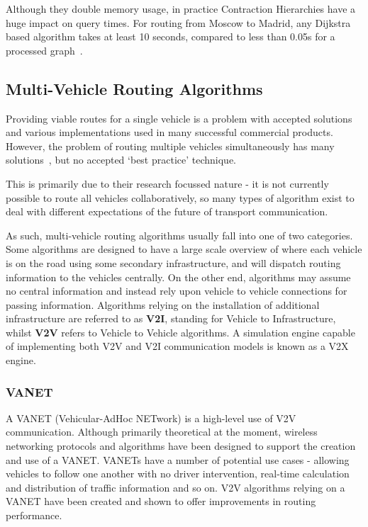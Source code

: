 \documentclass[ %
                    author={Alexander Hill},
                supervisor={Dr. Benjamin Sach},
                    degree={MEng},
                     title={MARMOSET},
                  subtitle={Multi-Agent Route Management using Online Simulation for Efficient Transportation},
                      type={research},
                      year={2016} ]{dissertation}
\begin{document}
Although they double memory usage, in practice Contraction Hierarchies have a
huge impact on query times. For routing from Moscow to Madrid, any Dijkstra
based algorithm takes at least 10 seconds, compared to less than 0.05s for a
processed graph~\cite{ch-perf}.

\subsection{Multi-Vehicle Routing Algorithms}

Providing viable routes for a single vehicle is a problem with accepted
solutions and various implementations used in many successful commercial
products. However, the problem of routing multiple vehicles simultaneously has
many solutions~\cite{beejama,rt:compstudy,rt:decentralized,
rt:guidance,rt:congestion,rt:car,rt:unexpected}, but no accepted `best practice'
technique.

This is primarily due to their research focussed nature - it is not currently
possible to route all vehicles collaboratively, so many types of algorithm exist
to deal with different expectations of the future of transport communication.

As such, multi-vehicle routing algorithms usually fall into one of two
categories. Some algorithms are designed to have a large scale overview of where
each vehicle is on the road using some secondary infrastructure, and will
dispatch routing information to the vehicles centrally. On the other end,
algorithms may assume no central information and instead rely upon vehicle to
vehicle connections for passing information. Algorithms relying on the
installation of additional infrastructure are referred to as \textbf{V2I},
standing for Vehicle to Infrastructure, whilst \textbf{V2V} refers to Vehicle to
Vehicle algorithms. A simulation engine capable of implementing both V2V and V2I
communication models is known as a V2X engine.

\subsubsection{VANET}

A VANET (Vehicular-AdHoc NETwork) is a high-level use of V2V communication.
Although primarily theoretical at the moment, wireless networking protocols and
algorithms have been designed to support the creation and use of a VANET. VANETs
have a number of potential use cases - allowing vehicles to follow one another
with no driver intervention, real-time calculation and distribution of traffic
information and so on. V2V algorithms relying on a VANET have been created and
shown to offer improvements in routing performance.
\end{document}
